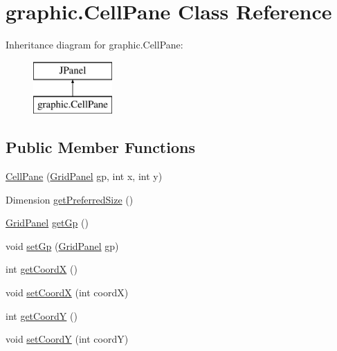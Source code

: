 \hypertarget{classgraphic_1_1_cell_pane}{}\section{graphic.\+Cell\+Pane Class Reference}
\label{classgraphic_1_1_cell_pane}
Inheritance diagram for graphic.\+Cell\+Pane\+:\begin{figure}[H]
\begin{center}
\leavevmode
\includegraphics[height=2.000000cm]{classgraphic_1_1_cell_pane}
\end{center}
\end{figure}
\subsection*{Public Member Functions}
\begin{DoxyCompactItemize}
\item 
\hyperlink{classgraphic_1_1_cell_pane_acfa4533330876d91705e1871c854c1f2}{Cell\+Pane} (\hyperlink{classgraphic_1_1_grid_panel}{Grid\+Panel} gp, int x, int y)
\item 
Dimension \hyperlink{classgraphic_1_1_cell_pane_a0fd531a6556674de04015e906aabe03a}{get\+Preferred\+Size} ()
\item 
\hyperlink{classgraphic_1_1_grid_panel}{Grid\+Panel} \hyperlink{classgraphic_1_1_cell_pane_a34a6be4ba7f268bc1cf97abb8133ea21}{get\+Gp} ()
\item 
void \hyperlink{classgraphic_1_1_cell_pane_aa61724c598a72a3b1968bc07bb2c29aa}{set\+Gp} (\hyperlink{classgraphic_1_1_grid_panel}{Grid\+Panel} gp)
\item 
int \hyperlink{classgraphic_1_1_cell_pane_a26561bfa4a8802268c9b081e5c5682f8}{get\+CoordX} ()
\item 
void \hyperlink{classgraphic_1_1_cell_pane_ad2287605b18570f3af59ada0e1feaade}{set\+CoordX} (int coordX)
\item 
int \hyperlink{classgraphic_1_1_cell_pane_a085ea8c70a07a051e103af3c89e66eb2}{get\+CoordY} ()
\item 
void \hyperlink{classgraphic_1_1_cell_pane_a5f6ca9deb28ada5b1442f6b9ecb3b616}{set\+CoordY} (int coordY)
\end{DoxyCompactItemize}


